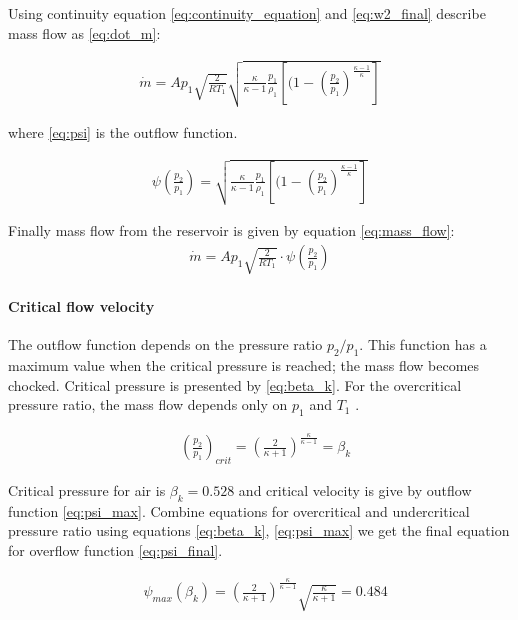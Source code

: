Using continuity equation \ref{eq:continuity_equation} and
\ref{eq:w2_final} describe mass flow as \ref{eq:dot_m}:

\begin{align}
    \dot{m} = A p_1 \sqrt{\frac{2}{RT_1}}
    \sqrt{\frac{\kappa}{\kappa-1} \frac{p_1}{\rho_1} 
    \left[(1-\left(\frac{p_2}{p_1}\right)^\frac{\kappa-1}{\kappa}\right]}
    \label{eq:dot_m}
\end{align}

where \ref{eq:psi} is the outflow function.

\begin{align}
    \psi\left(\frac{p_2}{p_1}\right) =  
    \sqrt{\frac{\kappa}{\kappa-1} \frac{p_1}{\rho_1} 
    \left[(1-\left(\frac{p_2}{p_1}\right)^\frac{\kappa-1}{\kappa}\right]}
    \label{eq:psi}
\end{align}

Finally mass flow from the reservoir is given by equation \ref{eq:mass_flow}:
\begin{align}
    \dot{m} = A p_1\sqrt{\frac{2}{RT_1}} \cdot \psi\left(\frac{p_2}{p_1}\right)
    \label{eq:mass_flow}
\end{align}


\paragraph{Critical flow velocity}
The outflow function depends on the pressure ratio $p_2/p_1$. This function
has a maximum value when the critical pressure is reached; the mass flow
becomes chocked. Critical pressure is presented by \ref{eq:beta_k}. For the
overcritical pressure ratio, the mass flow depends only on $p_1$ and $T_1$
\cite{isermann}.

\begin{align}
    &\left(\frac{p_2}{p_1}\right)_{crit} =
    \left(\frac{2}{\kappa+1}\right)^\frac{\kappa}{\kappa-1}=\beta_k
    \label{eq:beta_k}
\end{align}

Critical pressure for air is $\beta_k = 0.528$ and critical velocity is
give by outflow function \ref{eq:psi_max}. Combine equations for
overcritical and undercritical pressure ratio using equations
\ref{eq:beta_k}, \ref{eq:psi_max} we get the final equation for overflow
function \ref{eq:psi_final}.

\begin{align}
    &\psi_{max} (\beta_k) = 
    \left(\frac{2}{\kappa+1}\right)^\frac{\kappa}{\kappa-1}\sqrt{\frac{\kappa}{\kappa+1}}
    = 0.484
    \label{eq:psi_max}
\end{align}

